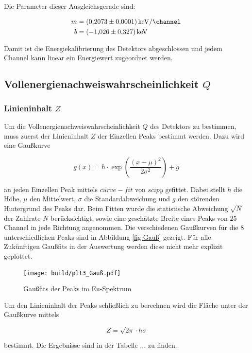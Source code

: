 Die Parameter dieser Ausgleichsgerade sind:

\begin{align*}
	m&=\qty[per-mode=fraction]{0.2073(0.0001)}{\kilo\eV\per\channel}\\
	b&=\qty{-1.026(0.327)}{\kilo\eV}
\end{align*}

Damit ist die Energiekalibrierung des Detektors abgeschlossen und jedem Channel kann linear ein Energiewert zugeordnet werden. 

\subsection{Vollenergienachweiswahrscheinlichkeit $Q$}
\subsubsection{Linieninhalt $Z$}
Um die Vollenergienachweiswahrscheinlichkeit $Q$ des Detektors zu bestimmen, muss zuerst der Linieninhalt $Z$ der Einzellen Peaks bestimmt werden. 
Dazu wird eine Gaußkurve 

\begin{equation}
	g(x)=h\cdot \exp(\frac{(x-\mu )^2}{2\sigma^2})+g
\end{equation}

an jeden Einzellen Peak mittels $curve-fit$ von $scipy$ \cite{scipy} gefittet. 
Dabei stellt $h$ die Höhe, $\mu$ den Mittelwert, $\sigma$ die Standardabweichung und $g$ den störenden Hintergrund des Peaks dar. 
Beim Fitten wurde die statistische Abweichung $\sqrt{N}$ der Zahlrate $N$ berücksichtigt, 
sowie eine geschätzte Breite eines Peaks von $25$ Channel in jede Richtung angenommen. 
Die verschiedenen Gaußkurven für die 8 unterschiedlichen Peaks sind in Abbildung \eqref{fig:Gauß} gezeigt. 
Für alle Zukünftigen Gaußfits in der Auswertung werden diese nicht mehr explizit geplottet. 

\begin{figure}
    \centering
    \texttt{[image: build/plt3\_Gauß.pdf]}
	\caption{Gaußfits der Peaks im Eu-Spektrum}
	\label{fig:Gauß}
\end{figure}

Um den Linieninhalt der Peaks schließlich zu berechnen wird die Fläche unter der Gaußkurve mittels 

\begin{equation}
	Z=\sqrt{2\pi}\cdot h\sigma
\end{equation}

bestimmt.
Die Ergebnisse sind in der Tabelle ... zu finden. 


